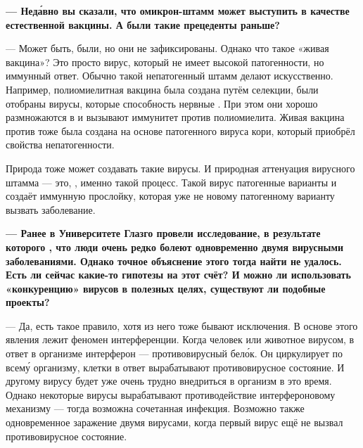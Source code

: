 {\bf --- Нед\'{а}вно вы сказали, что омикрон-штамм может выступить в качестве естественной вакцины. А были такие прецеденты раньше?}

---  Может быть, были, но они не зафиксированы. Однако что такое «живая вакцина»? Это просто вирус, который не имеет высокой патогенности, но  иммунный ответ. Обычно такой непатогенный штамм делают искусственно. Например, полиомиелитная вакцина была создана путём селекции, были отобраны вирусы, которые  способность  нервные . При этом они хорошо размножаются в  и вызывают  иммунитет против полиомиелита. Живая вакцина против  тоже была создана на основе патогенного вируса кори, который приобрёл свойства непатогенности.

Природа тоже может создавать такие вирусы. И природная аттенуация вирусного штамма --- это, , именно такой процесс. Такой вирус  патогенные варианты и создаёт иммунную прослойку, которая уже не  новому патогенному варианту вызвать заболевание.

{\bf --- Ранее в Университете Глазго провели исследование, в результате которого , что люди очень редко болеют одновременно двумя вирусными заболеваниями. Однако точное объяснение этого тогда найти не удалось. Есть ли сейчас какие-то гипотезы на этот счёт? И можно ли использовать «конкуренцию» вирусов в полезных целях, существуют ли подобные проекты?}

--- Да, есть такое правило, хотя из него тоже бывают исключения. В основе этого явления лежит феномен интерференции. Когда человек или животное  вирусом, в ответ в организме  интерферон --- противовирусный бел\'{о}к. Он циркулирует по всем\'{у} организму, клетки в ответ вырабатывают противовирусное состояние. И другому вирусу будет уже очень трудно внедриться в организм в это время. Однако некоторые вирусы вырабатывают противодействие интерфероновому механизму --- тогда возможна сочетанная инфекция. Возможно также одновременное заражение двумя вирусами, когда первый вирус ещё не вызвал противовирусное состояние.

